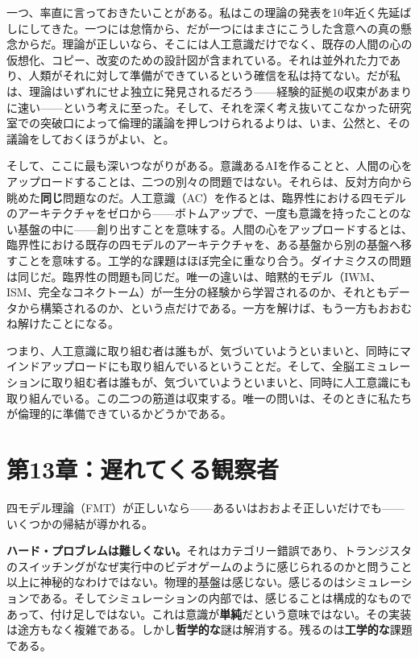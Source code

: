 \documentclass[11pt, twoside, openright]{book}
\begin{document}
一つ、率直に言っておきたいことがある。私はこの理論の発表を10年近く先延ばしにしてきた。一つには怠惰から、だが一つにはまさにこうした含意への真の懸念からだ。理論が正しいなら、そこには人工意識だけでなく、既存の人間の心の仮想化、コピー、改変のための設計図が含まれている。それは並外れた力であり、人類がそれに対して準備ができているという確信を私は持てない。だが私は、理論はいずれにせよ独立に発見されるだろう------経験的証拠の収束があまりに速い------という考えに至った。そして、それを深く考え抜いてこなかった研究室での突破口によって倫理的議論を押しつけられるよりは、いま、公然と、その議論をしておくほうがよい、と。

そして、ここに最も深いつながりがある。意識あるAIを作ることと、人間の心をアップロードすることは、二つの別々の問題ではない。それらは、反対方向から眺めた\textbf{同じ}問題なのだ。人工意識（AC）を作るとは、臨界性における四モデルのアーキテクチャをゼロから------ボトムアップで、一度も意識を持ったことのない基盤の中に------創り出すことを意味する。人間の心をアップロードするとは、臨界性における既存の四モデルのアーキテクチャを、ある基盤から別の基盤へ移すことを意味する。工学的な課題はほぼ完全に重なり合う。ダイナミクスの問題は同じだ。臨界性の問題も同じだ。唯一の違いは、暗黙的モデル（IWM、ISM、完全なコネクトーム）が一生分の経験から学習されるのか、それともデータから構築されるのか、という点だけである。一方を解けば、もう一方もおおむね解けたことになる。

つまり、人工意識に取り組む者は誰もが、気づいていようといまいと、同時にマインドアップロードにも取り組んでいるということだ。そして、全脳エミュレーションに取り組む者は誰もが、気づいていようといまいと、同時に人工意識にも取り組んでいる。この二つの筋道は収束する。唯一の問いは、そのときに私たちが倫理的に準備できているかどうかである。


\chapter*{第13章：遅れてくる観察者}

四モデル理論（FMT）が正しいなら------あるいはおおよそ正しいだけでも------いくつかの帰結が導かれる。

\textbf{ハード・プロブレムは難しくない。}それはカテゴリー錯誤であり、トランジスタのスイッチングがなぜ実行中のビデオゲームのように感じられるのかと問うこと以上に神秘的なわけではない。物理的基盤は感じない。感じるのはシミュレーションである。そしてシミュレーションの内部では、感じることは構成的なものであって、付け足しではない。これは意識が\textbf{単純}だという意味ではない。その実装は途方もなく複雑である。しかし\textbf{哲学的な}謎は解消する。残るのは\textbf{工学的な}課題である。
\end{document}
